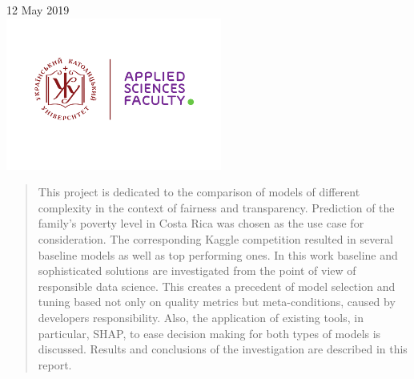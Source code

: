 \begin{titlepage}
\vspace*{1cm}
{\large 12 May 2019}\\[2cm] %


\includegraphics[height=5cm]{images/UCU-Apps.png}\\[1cm] %
 

\vfill %

\end{titlepage}

\begin{abstract} %
    This project is dedicated to the comparison of models of different complexity in the context of fairness and transparency. Prediction of the family’s poverty level in Costa Rica was chosen as the use case for consideration. The corresponding Kaggle competition resulted in several baseline models as well as top performing ones. In this work baseline and sophisticated solutions are investigated from the point of view of responsible data science. This creates a precedent of model selection and tuning based not only on quality metrics but meta-conditions, caused by developers responsibility. Also, the application of existing tools, in particular, SHAP, to ease decision making for both types of models is discussed. Results and conclusions of the investigation are described in this report.
\end{abstract}

